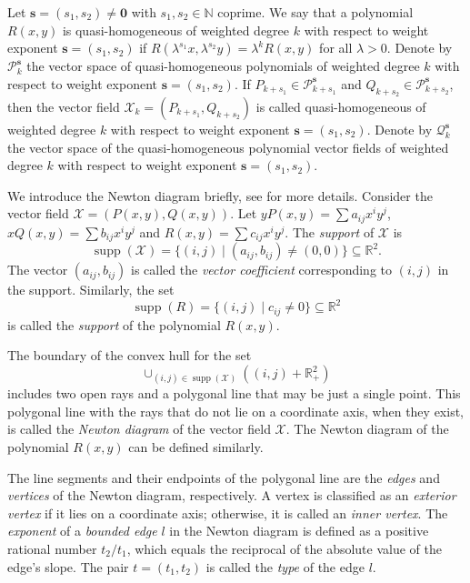 \documentclass[10pt,a4paper]{amsart}
\numberwithin{equation}{section}
\begin{document}
Let $\mathbf{s} = (s_{1},s_{2})\neq \boldsymbol{0} $ with $s_{1}, s_{2}\in\mathbb{N}$ 
coprime. We say that a polynomial $R(x,y)$ is quasi-homogeneous of weighted degree 
$k$ with respect to weight exponent $\mathbf{s} = (s_{1},s_{2})$ if 
$R(\lambda^{s_{1}}x,\lambda^{s_{2}}y)=\lambda^{k}R(x,y)$ for all $\lambda >0$. 
Denote by $\mathcal{P}_{k}^{\mathbf{s}}$ the vector space of quasi-homogeneous 
polynomials of weighted degree $k$ with respect to weight exponent 
$\mathbf{s} = (s_{1},s_{2})$. If $P_{k+s_{1}}\in \mathcal{P}_{k+s_{1}}^{\mathbf{s}}$ and 
$Q_{k+s_{2}}\in \mathcal{P}_{k+s_{2}}^{\mathbf{s}}$, then the vector field 
$\mathscr{X}_{k}=(P_{k+s_{1}},Q_{k+s_{2}})$ is called quasi-homogeneous of weighted 
degree $k$ with respect to weight exponent $\mathbf{s} = (s_{1},s_{2})$. 
Denote by $\mathcal{Q}_{k}^{\mathbf{s}}$ the vector space of the quasi-homogeneous 
polynomial vector fields of weighted degree $k$ with respect to weight exponent 
$\mathbf{s} = (s_{1},s_{2})$.

 We introduce the Newton diagram briefly, see \cite{bib 2, bib 5} for more details.
Consider the vector field $\mathscr{X}= (P(x,y), Q(x,y))$. 
Let $yP(x,y)=\sum a_{ij}x^{i}y^{j}$, $xQ(x,y)=\sum b_{ij}x^{i}y^{j}$ and 
$R(x,y)=\sum c_{ij}x^{i}y^{j}$. The \emph{support} of $\mathscr{X}$ is 
\[
\operatorname{supp}(\mathscr{X})=\{(i,j)\mid(a_{ij},b_{ij})\neq (0,0)\}
\subseteq \mathbb{R}^2.
\]
The vector $(a_{ij},b_{ij})$ is called the \emph{vector coefficient} corresponding to 
$(i,j)$ in the support. Similarly, the set
\[
\operatorname{supp}(R)=\{(i,j)\mid c_{ij}\neq 0\}\subseteq \mathbb{R}^2
\]
is called the \emph{support} of the polynomial $R(x,y)$.

The boundary of the convex hull for the set
$$
\cup_{(i,j)\in \operatorname{supp}(\mathscr{X})}((i,j)+\mathbb{R}_{+}^{2})
$$
includes two open rays and a polygonal line that may be just a single point. 
This polygonal line with the rays that do not lie on a coordinate axis, when they exist, 
is called the \emph{Newton diagram} of the vector field $\mathscr{X}$. 
The Newton diagram of the polynomial $R(x,y)$ can be defined similarly.

The line segments and their endpoints of the polygonal line are the \emph{edges} 
and \emph{vertices} of the Newton diagram, respectively. 
A vertex is classified as an \emph{exterior vertex} if it lies on a coordinate axis; 
otherwise, it is called an \emph{inner vertex}. The \emph{exponent} of a 
\emph{bounded edge} $l$ in the Newton diagram is defined as a positive rational number 
$t_2/t_1$, which equals the reciprocal of the absolute value of the edge's slope. 
The pair $t=(t_1,t_2)$ is called the \emph{type} of the edge $l$.
\end{document}
